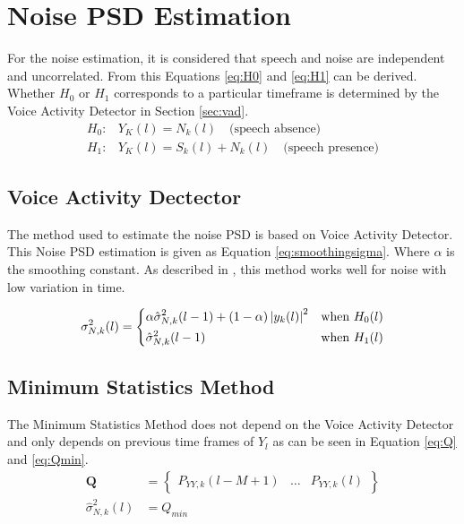 \section{Noise PSD Estimation} \label{sec:noise_estimation}
For the noise estimation, it is considered that speech and noise are independent and uncorrelated. From this Equations \ref{eq:H0} and \ref{eq:H1} can be derived. Whether $H_0$ or $H_1$ corresponds to a particular timeframe is determined by the Voice Activity Detector in Section \ref{sec:vad}.
\begin{align}
  H_{0}: & Y_{K}(l) = N_{k}(l) \quad \text{(speech absence)}
  \label{eq:H0} \\
  H_{1}: & Y_{K}(l) = S_{k}(l) + N_{k}(l) \quad \text{(speech presence)}
  \label{eq:H1}
\end{align}

\subsection{Voice Activity Dectector}
The method used to estimate the noise PSD is based on Voice Activity Detector. This Noise PSD estimation is given as Equation \ref{eq:smoothingsigma}. Where $\alpha$ is the smoothing constant. As described in \cite{Hendriks}, this method works well for noise with low variation in time.

\begin{equation}
  \sigma_{N,k}^{2}(l)=
  \begin{dcases}
      \alpha \hat \sigma_{N,k}^{2}(l-1) + (1-\alpha)\abs{y_{k}(l)}^{2} & \text{when } H_{0}(l)\\
      \hat \sigma_{N,k}^{2}(l-1) & \text{when } H_{1}(l)
  \end{dcases}
  \label{eq:smoothingsigma}
\end{equation}


\subsection{Minimum Statistics Method}
The Minimum Statistics Method does not depend on the Voice Activity Detector and only depends on previous time frames of $Y_{l}$ as can be seen in Equation \ref{eq:Q} and \ref{eq:Qmin}.
\begin{align}
  \mathbf{Q} &=
  \begin{Bmatrix}
    P_{YY,k}(l-M+1) & \hdots & P_{YY,k}(l)
  \end{Bmatrix}
  \label{eq:Q} \\
  \hat \sigma_{N,k}^{2}(l) &= Q_{min}
  \label{eq:Qmin}
\end{align}

